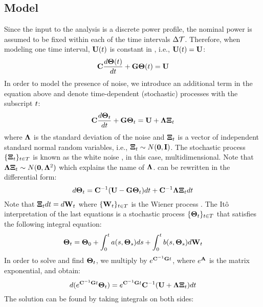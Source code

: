 \subsection{Model}
Since the input to the analysis is a discrete power profile, the nominal power is assumed to be fixed within each of the time intervals $\Delta \mathcal{T}$. Therefore, when modeling one time interval, $\mathbf{U}(t)$ is constant in , i.e., $\mathbf{U}(t) = \mathbf{U}$:
\[
  \mathbf{C} \frac{d\mathbf{\Theta}(t)}{dt} + \mathbf{G} \mathbf{\Theta}(t) = \mathbf{U}
\]
In order to model the presence of noise, we introduce an additional term in the equation above and denote time-dependent (stochastic) processes with the subscript $t$:
\begin{equation} \equlabel{fourier-noise}
  \mcapacitance \frac{d\vtemperature_\time}{d\time} + \mconductance \vtemperature_\time = \vpower + \mnoisedeviation \vnoise_t
\end{equation}
where $\mathbf{\Lambda}$ is the standard deviation of the noise and $\mathbf{\Xi}_t$ is a vector of independent standard normal random variables, i.e., $\mathbf{\Xi}_t \sim N(\mathbf{0}, \mathbf{I})$. The stochastic process $\{ \mathbf{\Xi}_t \}_{t \in T}$ is known as the white noise \cite{oksendal2003}, in this case, multidimensional. Note that $\mathbf{\Lambda} \mathbf{\Xi}_t \sim N(\mathbf{0}, \mathbf{\Lambda}^2)$ which explains the name of $\mathbf{\Lambda}$.  can be rewritten in the differential form:
\begin{equation} \equlabel{fourier-wiener}
  d\vtemperature_\time = \mcapacitance^{-1}(\vpower - \mconductance \vtemperature_\time)d\time + \mcapacitance^{-1} \mnoisedeviation \vnoise_t d\time
\end{equation}
Note that $\mathbf{\Xi}_t dt = d\mathbf{W}_t$ where $\{ \mathbf{W}_t \}_{t \in T}$ is the Wiener process \cite{oksendal2003}. The It\^{o} interpretation \cite{oksendal2003} of the last equations is a stochastic process $\{ \mathbf{\Theta}_t \}_{t \in T}$ that satisfies the following integral equation:
\[
  \mathbf{\Theta}_t = \mathbf{\Theta}_0 + \int_0^t a(s, \mathbf{\Theta}_s)ds + \int_0^t b(s, \mathbf{\Theta}_s) d\mathbf{W}_t
\]
In order to solve  and find $\mathbf{\Theta}_t$, we multiply  by $e^{ \mathbf{C}^{-1} \mathbf{G} t}$, where $e^{\mathbf{A}}$ is the matrix exponential, and obtain:
\[
  d(e^{\mathbf{C}^{-1} \mathbf{G} t} \mathbf{\Theta}_t) = e^{\mathbf{C}^{-1} \mathbf{G} t} \mathbf{C}^{-1} (\mathbf{U} + \mathbf{\Lambda} \mathbf{\Xi}_t) dt
\]
The solution can be found by taking integrals on both sides:
